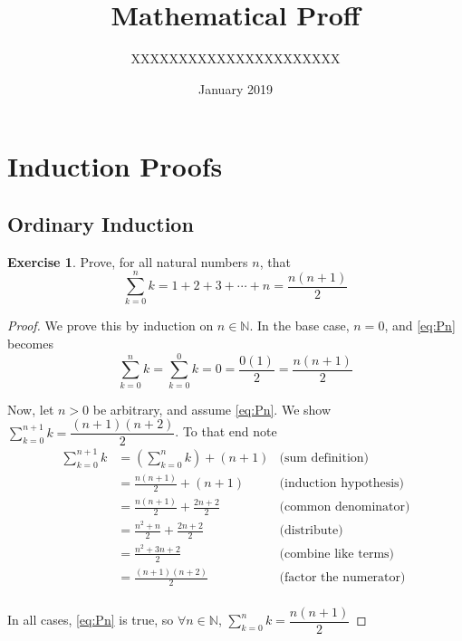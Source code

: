 \documentclass[12pt]{extarticle}
\title{Mathematical Proff}
\author{XXXXXXXXXXXXXXXXXXXXXX}
\date{January 2019}
\newcommand{\N}{\mathbb{N}}
\newcommand{\<}{\langle}
\renewcommand{\>}{\rangle}
\theoremstyle{definition}
\newtheorem{exercise}{Exercise}
\newcommand{\Disp}{\displaystyle}
\begin{document}
\maketitle

\section{Induction Proofs}
\subsection{Ordinary Induction}
\begin{exercise} Prove, for all natural numbers $n$, that 
\begin{equation} \sum_{k=0}^n k = 1 + 2 + 3 + \cdots + n = \dfrac{n(n+1)}{2}
\label{eq:Pn}\end{equation}
\end{exercise}

\begin{proof}
We prove this by induction on $n\in\N$.  In the base case, $n=0$, and \eqref{eq:Pn} becomes
$$\sum_{k=0}^n k = \sum_{k=0}^0 k = 0 = \dfrac{0(1)}{2} = \dfrac{n(n+1)}{2}$$

Now, let $n>0$ be arbitrary, and assume \eqref{eq:Pn}.
We show $\displaystyle \sum_{k=0}^{n+1} k = \dfrac{(n+1)(n+2)}{2}$.
To that end note 
\begin{align*}
	\sum_{k=0}^{n+1} k &= \left(\sum_{k=0}^{n} k\right) + (n+1) &\mbox{(sum definition)}\\
	&= \frac{n(n+1)}{2} + (n+1) &\mbox{(induction hypothesis)}
	\\
	&= \frac{n(n+1)}{2} + \frac{2n+2}{2} &\mbox{(common denominator)}
	\\
	&= \frac{n^2 +n}{2} + \frac{2n+2}{2} &\mbox{(distribute)}
	\\
	&= \frac{n^2 +3n + 2}{2} &\mbox{(combine like terms)}
	\\
	&= \frac{(n+1)(n+2)}{2} & \mbox{(factor the numerator)}\\
\end{align*}

In all cases, \eqref{eq:Pn} is true, so $\forall n\in \N$, 
$\Disp \sum_{k=0}^n k = \dfrac{n(n+1)}{2}$
\end{proof}
\end{document}
